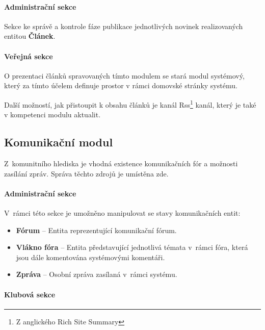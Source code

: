 \documentclass[11pt,oneside]{fithesis}
\begin{document}
            \paragraph*{Administrační sekce}

            Sekce ke správě a kontrole fáze publikace jednotlivých novinek realizovaných entitou \textbf{Článek}.

            \paragraph*{Veřejná sekce}

            O prezentaci článků spravovaných tímto modulem se stará modul systémový, který za tímto účelem definuje prostor v rámci domovské stránky systému.

            Další možností, jak přistoupit k obsahu článků je kanál Rss\footnote{Z anglického Rich Site Summary} kanál, který je také v kompetenci modulu aktualit.

            \subsection{Komunikační modul}
            Z komunitního hlediska je vhodná existence komunikačních fór a možnosti zasílání zpráv. Správa těchto zdrojů je umístěna zde.

            \paragraph*{Administrační sekce}

            V rámci této sekce je umožněno manipulovat se stavy komunikačních entit:
            \begin{itemize}
                \item \textbf{Fórum} – Entita reprezentující komunikační fórum.
                \item \textbf{Vlákno fóra} – Entita představující jednotlivá témata v rámci fóra, která jsou dále komentována systémovými komentáři.
                \item \textbf{Zpráva} – Osobní zpráva zasílaná v rámci systému.
            \end{itemize}

            \paragraph*{Klubová sekce}
\end{document}
